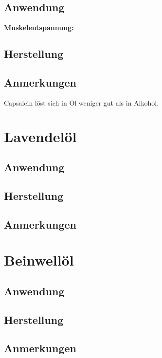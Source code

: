 \subsection{Anwendung}
\textbf{Muskelentspannung:}

\subsection{Herstellung}
\subsection{Anmerkungen}

Capsaicin löst sich in Öl weniger gut als in Alkohol.



\newpage



\section{Lavendelöl}


\subsection{Anwendung}
\subsection{Herstellung}
\subsection{Anmerkungen}



\newpage




\section{Beinwellöl}


\subsection{Anwendung}
\subsection{Herstellung}
\subsection{Anmerkungen}



